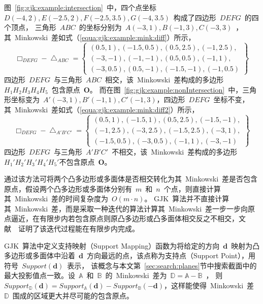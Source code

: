 图~\ref{fig:gjk:example:intersection}~中，四个点坐标~$D(-4, 2), E(-2.5, 2), F(-2.5, 3.5), G(-4, 3.5)$~构成了四边形~$DEFG$~的四个顶点，
三角形~$ABC$~的坐标分别为~$A(-3, 1), B(-1,3), C(-3, 3)$~，其~Minkowski~差如式（\ref{equa:gjk:example:mink:diff}）所示，
\begin{equation}
\label{equa:gjk:example:mink:diff}
\Box_{DEFG} - \bigtriangleup_{ABC} = \left\{ 
  \begin{array}{l}
    (0.5, 1),  (-1.5, 0.5),  (0.5, 2.5), (-1, 2.5), \\ 
    (-3, -1), (-1, -1),  (0.5, 0.5), (-1, 1), \\
    (-3, 0.5), (0.5, -1), (-1.5, -1), (-1, 0.5)
  \end{array}
    \right\}  
\end{equation}
四边形~$DEFG$~与三角形~$ABC$~相交，该~Minkowski~差构成的多边形~$H_1H_2H_3H_4H_5$~包含原点~$\bm{O}$。
而在图~\ref{fig:gjk:example:nonIntersection}~中，三角形坐标变为~$A'(-3, 1), B'(-1, 1), C'(-1,3)$，四边形~$DEFG$~坐标不变，其~Minkowski~差如式（\ref{equa:gjk:example:mink:diff2}）所示，
\begin{equation}
\label{equa:gjk:example:mink:diff2}
\Box_{DEFG} - \bigtriangleup_{A'B'C'} = \left\{ 
  \begin{array}{l}
   (0.5, 1), (-1.5, 1), (0.5, 2.5)  , (-1.5, -1), \\
   (-1, 2.5),(-3, 2.5),  (-1.5, 2.5), (-3, 1),  \\
   (-1.5, 0.5), (-3, 0.5), (-1, 1),(-3, -1) 
  \end{array}
  \right\}  
\end{equation}
四边形~$DEFG$~与三角形~$A'B'C'$~不相交，该~Minkowski~差构成的多边形~$H_1'H_2'H_3'H_4'H_5'$不包含原点~$\bm{O}$。

通过该方法可将两个凸多边形或多面体是否相交转化为其~Minkowski~差是否包含原点，假设两个凸多边形或多面体分别有~$m$~和~$n$~个点，则直接计算其~Minkowski~差的时间复杂度为~$O(m \cdot n)$。
GJK~算法并不直接计算其~Minkowski~差，而是采取一种迭代的算法计算其~Minkowski~差一步一步向原点逼近，在有限步内若包含原点则原凸多边形或凸多面体相交反之不相交，文献~~证明了该迭代过程能在有限步内完成。

GJK~算法中定义支持映射（Support Mapping）函数为将给定的方向~$\bm{d}$~映射为凸多边形或多面体中沿着~$\bm{d}$~方向最远的点，该点称为支持点（Support Point），用符号~$Support(\bm{d})$~表示，
该概念与本文第~\ref{sec:search:planes}节中搜索截面中的最大投影值点一致。设~$\mathbb{A}$~和~$\mathbb{B}$~的~Minkowski~差为~$\mathbb{D} = \mathbb{A}-\mathbb{B}$~，
则~$Support_\mathbb{D}(\bm{d}) = Support_\mathbb{A}(\bm{d}) - Support_\mathbb{B}(-\bm{d})$，这样能使得~Minkowski~差~$\mathbb{D}$~围成的区域更大并尽可能的包含原点。

